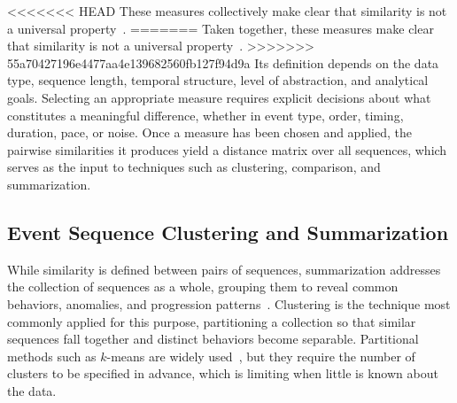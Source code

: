 <<<<<<< HEAD
These measures collectively make clear that similarity is not a universal property~\cite{linden2023survey}.
=======
Taken together, these measures make clear that similarity is not a universal property~\cite{linden2023survey}.
>>>>>>> 55a70427196e4477aa4e139682560fb127f94d9a
Its definition depends on the data type, sequence length, temporal structure, level of abstraction, and analytical goals.
Selecting an appropriate measure requires explicit decisions about what constitutes a meaningful difference, whether in event type, order, timing, duration, pace, or noise.
Once a measure has been chosen and applied, the pairwise similarities it produces yield a distance matrix over all sequences, which serves as the input to techniques such as clustering, comparison, and summarization.



\subsection{Event Sequence Clustering and Summarization}

While similarity is defined between pairs of sequences, summarization addresses the collection of sequences as a whole, grouping them to reveal common behaviors, anomalies, and progression patterns~\cite{guo2022survey}.
Clustering is the technique most commonly applied for this purpose, partitioning a collection so that similar sequences fall together and distinct behaviors become separable.
Partitional methods such as $k$-means are widely used~\cite{forgy1965cluster}, but they require the number of clusters to be specified in advance, which is limiting when little is known about the data.

